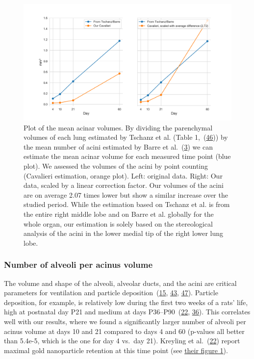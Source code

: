 \documentclass[
  american,
]{article}
\begin{document}
\begin{figure}
\hypertarget{fig:06}{%
\centering
\includegraphics{images/fig06.png}
\caption{Plot of the mean acinar volumes.
By dividing the parenchymal volumes of each lung estimated by Tschanz et al.
(Table 1,~(\protect\hyperlink{ref-wnl86DEM}{46})) by the mean number of acini estimated by Barre et al.~(\protect\hyperlink{ref-uFNlWogb}{3}) we can estimate the mean acinar volume for each measured time point (blue plot).
We assessed the volumes of the acini by point counting (Cavalieri estimation, orange plot).
Left: original data.
Right: Our data, scaled by a linear correction factor.
Our volumes of the acini are on average 2.07 times lower but show a similar increase over the studied period.
While the estimation based on Tschanz et al.
is from the entire right middle lobe and on Barre et al.
globally for the whole organ, our estimation is solely based on the stereological analysis of the acini in the lower medial tip of the right lower lung lobe.}\label{fig:06}
}
\end{figure}

\hypertarget{number-of-alveoli-per-acinus-volume}{%
\subsubsection{Number of alveoli per acinus volume}\label{number-of-alveoli-per-acinus-volume}}

The volume and shape of the alveoli, alveolar ducts, and the acini are critical parameters for ventilation and particle deposition~(\protect\hyperlink{ref-1HOyVjqpM}{15}, \protect\hyperlink{ref-eioib1TQ}{43}, \protect\hyperlink{ref-OT4s1CSX}{47}).
Particle deposition, for example, is relatively low during the first two weeks of a rats' life, high at postnatal day P21 and medium at days P36--P90~(\protect\hyperlink{ref-18DcNLAv6}{22}, \protect\hyperlink{ref-yHHhvOtP}{36}).
This correlates well with our results, where we found a significantly larger number of alveoli per acinus volume at days 10 and 21 compared to days 4 and 60 (p-values all better than 5.4e-5, which is the one for day 4 vs.~day 21).
Kreyling et al.~(\protect\hyperlink{ref-18DcNLAv6}{22}) report maximal gold nanoparticle retention at this time point (see \href{https://pubs.acs.org/doi/10.1021/acsnano.8b01826\#fig1}{their figure 1}).
\end{document}
